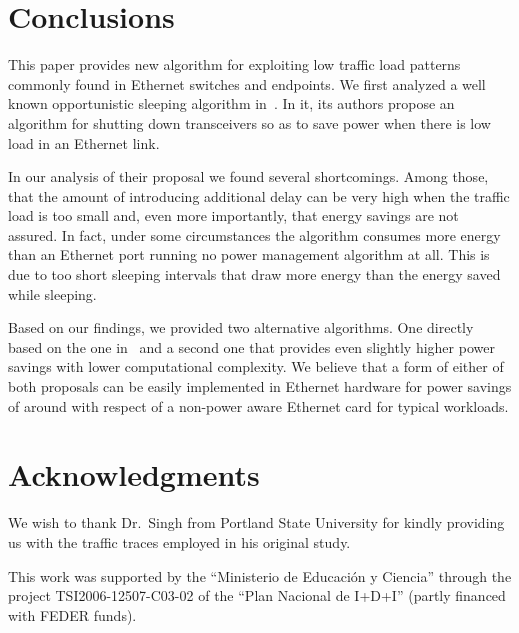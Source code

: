\documentclass[conference,english]{IEEEtran}
\begin{document}
\section{Conclusions}
\label{sec:conclusions}

This paper provides new algorithm for exploiting low traffic load patterns
commonly found in Ethernet switches and endpoints. We first analyzed a well
known opportunistic sleeping algorithm
in~\cite{gupta07:_using_low_power_modes_for}. In it, its authors propose an
algorithm for shutting down transceivers so as to save power when there is low
load in an Ethernet link.

In our analysis of their proposal we found several shortcomings. Among those,
that the amount of introducing additional delay can be very high when the
traffic load is too small and, even more importantly, that energy savings are
not assured. In fact, under some circumstances the algorithm consumes more
energy than an Ethernet port running no power management algorithm at all.
This is due to too short sleeping intervals that draw more energy than the
energy saved while sleeping.

Based on our findings, we provided two alternative algorithms. One directly
based on the one in~\cite{gupta07:_using_low_power_modes_for} and a second one
that provides even slightly higher power savings with lower computational
complexity. We believe that a form of either of both proposals can be easily
implemented in Ethernet hardware for power savings of around  with
respect of a non-power aware Ethernet card for typical workloads.

\section*{Acknowledgments}
\label{sec:acknowlgedgments}

We wish to thank Dr.~Singh from Portland State University for kindly providing
us with the traffic traces employed in his original study.

This work was supported by the ``Ministerio de Educación y Ciencia'' through
the project TSI2006-12507-C03-02 of the ``Plan Nacional de I+D+I'' (partly
financed with FEDER funds).

\balance{}



\end{document}
